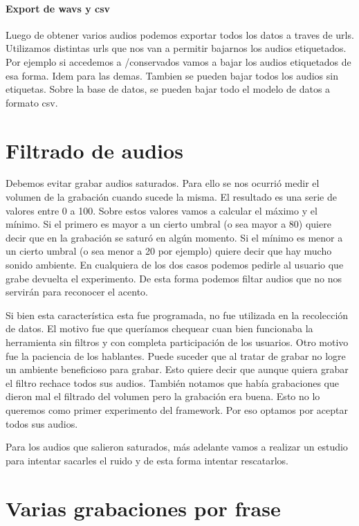 \documentclass[11pt,a4paper,twoside]{tesis}
\begin{document}
\paragraph{Export de wavs y csv}

Luego de obtener varios audios podemos exportar todos los datos a traves de urls. Utilizamos distintas urls que nos van a permitir bajarnos los audios etiquetados. Por ejemplo si accedemos a /conservados vamos a bajar los audios etiquetados de esa forma. Idem para las demas. Tambien se pueden bajar todos los audios sin etiquetas. Sobre la base de datos, se pueden bajar todo el modelo de datos a formato csv.

\section{Filtrado de audios}

Debemos evitar grabar audios saturados. Para ello se nos ocurrió medir el volumen de la grabación cuando sucede la misma. El resultado es una serie de valores entre 0 a 100. Sobre estos valores vamos a calcular el máximo y el mínimo. Si el primero es mayor a un cierto umbral (o sea mayor a 80) quiere decir que en la grabación se saturó en algún momento. Si el mínimo es menor a un cierto umbral (o sea menor a 20 por ejemplo) quiere decir que hay mucho sonido ambiente. En cualquiera de los dos casos podemos pedirle al usuario que grabe devuelta el experimento. De esta forma podemos filtar audios que no nos servirán para reconocer el acento.

Si bien esta característica esta fue programada, no fue utilizada en la recolección de datos. El motivo fue que queríamos chequear cuan bien funcionaba la herramienta sin filtros y con completa participación de los usuarios. Otro motivo fue la paciencia de los hablantes. Puede suceder que al tratar de grabar no logre un ambiente beneficioso para grabar. Esto quiere decir que aunque quiera grabar el filtro rechace todos sus audios. También notamos que había grabaciones que dieron mal el filtrado del volumen pero la grabación era buena. Esto no lo queremos como primer experimento del framework. Por eso optamos por aceptar todos sus audios.

Para los audios que salieron saturados, más adelante vamos a realizar un estudio para intentar sacarles el ruido y de esta forma intentar rescatarlos.

\section{Varias grabaciones por frase}
\end{document}

